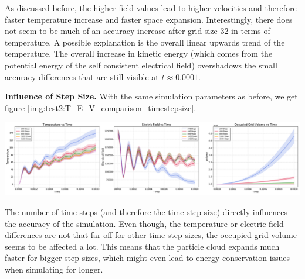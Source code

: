 As discussed before, the higher field values lead to higher velocities and therefore faster temperature increase and faster space expansion. Interestingly, there does not seem to be much of an accuracy increase after grid size $32$ in terms of temperature. A possible explanation is the overall linear upwards trend of the temperature. The overall increase in kinetic energy (which comes from the potential energy of the self consistent electrical field) overshadows the small accuracy differences that are still visible at $t \approx 0.0001$.


\textbf{Influence of Step Size.} With the same simulation parameters as before, we get figure \ref{img:test2:T_E_V_comparison_timestepsize}. \\
\begin{minipage}[h]{\linewidth}
    \vspace{5pt}
    \centering
    \includegraphics[width=\linewidth]{ressources/test2/T_E_V_comparison_timestepsize.pdf}
    \label{img:test2:T_E_V_comparison_timestepsize}
    \vspace{5pt}
\end{minipage}
The number of time steps (and therefore the time step size)  directly influences the accuracy of the simulation. Even though, the temperature or electric field differences are not that far off for other time step sizes, the occupied grid volume seems to be affected a lot. This means that the particle cloud expands much faster for bigger step sizes, which might even lead to energy conservation issues when simulating for longer. 

